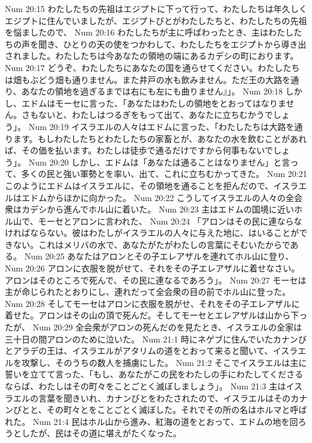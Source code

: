 Num 20:15  わたしたちの先祖はエジプトに下って行って、わたしたちは年久しくエジプトに住んでいましたが、エジプトびとがわたしたちと、わたしたちの先祖を悩ましたので、
Num 20:16  わたしたちが主に呼ばわったとき、主はわたしたちの声を聞き、ひとりの天の使をつかわして、わたしたちをエジプトから導き出されました。わたしたちは今あなたの領地の端にあるカデシの町におります。
Num 20:17  どうぞ、わたしたちにあなたの国を通らせてください。わたしたちは畑もぶどう畑も通りません。また井戸の水も飲みません。ただ王の大路を通り、あなたの領地を過ぎるまでは右にも左にも曲りません』」。
Num 20:18  しかし、エドムはモーセに言った、「あなたはわたしの領地をとおってはなりません。さもないと、わたしはつるぎをもって出て、あなたに立ちむかうでしょう」。
Num 20:19  イスラエルの人々はエドムに言った、「わたしたちは大路を通ります。もしわたしたちとわたしたちの家畜とが、あなたの水を飲むことがあれば、その価を払います。わたしは徒歩で通るだけですから何事もないでしょう」。
Num 20:20  しかし、エドムは「あなたは通ることはなりません」と言って、多くの民と強い軍勢とを率い、出て、これに立ちむかってきた。
Num 20:21  このようにエドムはイスラエルに、その領地を通ることを拒んだので、イスラエルはエドムからほかに向かった。
Num 20:22  こうしてイスラエルの人々の全会衆はカデシから進んでホル山に着いた。
Num 20:23  主はエドムの国境に近いホル山で、モーセとアロンに言われた、
Num 20:24  「アロンはその民に連ならなければならない。彼はわたしがイスラエルの人々に与えた地に、はいることができない。これはメリバの水で、あなたがたがわたしの言葉にそむいたからである。
Num 20:25  あなたはアロンとその子エレアザルを連れてホル山に登り、
Num 20:26  アロンに衣服を脱がせて、それをその子エレアザルに着せなさい。アロンはそのところで死んで、その民に連なるであろう」。
Num 20:27  モーセは主が命じられたとおりにし、連れだって全会衆の目の前でホル山に登った。
Num 20:28  そしてモーセはアロンに衣服を脱がせ、それをその子エレアザルに着せた。アロンはその山の頂で死んだ。そしてモーセとエレアザルは山から下ったが、
Num 20:29  全会衆がアロンの死んだのを見たとき、イスラエルの全家は三十日の間アロンのために泣いた。
Num 21:1  時にネゲブに住んでいたカナンびとアラデの王は、イスラエルがアタリムの道をとおって来ると聞いて、イスラエルを攻撃し、そのうちの数人を捕虜にした。
Num 21:2  そこでイスラエルは主に誓いを立てて言った、「もし、あなたがこの民をわたしの手にわたしてくださるならば、わたしはその町々をことごとく滅ぼしましょう」。
Num 21:3  主はイスラエルの言葉を聞きいれ、カナンびとをわたされたので、イスラエルはそのカナンびとと、その町々とをことごとく滅ぼした。それでその所の名はホルマと呼ばれた。
Num 21:4  民はホル山から進み、紅海の道をとおって、エドムの地を回ろうとしたが、民はその道に堪えがたくなった。
